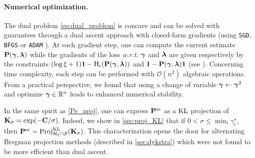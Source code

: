 \paragraph{Numerical optimization.} The dual problem \eqref{eq:dual_problem} is concave and can be solved with guarantees through a dual ascent approach with closed-form gradients (using \eg \texttt{SGD}, \texttt{BFGS} \citep{liu1989limited} or \texttt{ADAM} \citep{kingma2014adam}).
At each gradient step, one can compute the current estimate $\mathbf{P}(\bm{\gamma}, \bm{\lambda})$ while the gradients of the loss \textit{w.r.t.} $\boldsymbol{\gamma}$ and $\boldsymbol{\lambda}$ are given respectively by the constraints $(\log{\xi}+1)
\bm{1} - \operatorname{H}_{\mathrm{r}}(\mathbf{P}(\bm{\gamma}, \bm{\lambda}))$ and $ \bm{1} - \mathbf{P}(\bm{\gamma}, \bm{\lambda}) \bm{1}$ (see \eg \cite[Proposition 6.1.1]{bertsekas1997nonlinear}).
Concerning time
complexity, each step can be performed with $\mathcal{O}(n^2)$ algebraic
operations. From a practical perspective, we found that using a change of variable $\boldsymbol{\gamma} \leftarrow \boldsymbol{\gamma}^2$ and optimize $\boldsymbol{\gamma} \in \mathbb{R}^n$ leads to enhanced numerical stability.

\begin{remark}
  In the same spirit as \cref{Pe_proj}, one can express $\mathbf{P}^{\mathrm{se}}$ as a $\operatorname{KL}$ projection of $\mathbf{K}_{\sigma} = \exp(-\mathbf{C}/\sigma)$.
  Indeed, we show in \cref{sec:proj_KL} that if $0 < \sigma \leq \min_i \gamma^\star_i$, then $\mathbf{P}^{\mathrm{se}} = \operatorname{Proj}^{\operatorname{\operatorname{KL}}}_{\mathcal{H}_{\xi} \cap
  \mathcal{S}}(\mathbf{K}_{\sigma})$. This characterization opens the door for alternating Bregman projection methods (described in \cref{sec:dykstra}) which were not found to be more efficient than dual ascent.
\end{remark}

